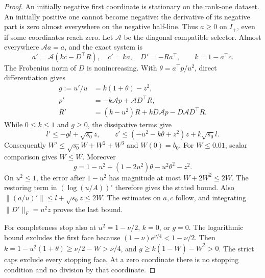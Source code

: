 \documentclass{article} %
\theoremstyle{plain}
\theoremstyle{definition}
\theoremstyle{remark}
\begin{document}
\begin{proof}
An initially negative first coordinate is stationary on the rank-one
dataset. An initially positive one cannot become negative: the derivative
of its negative part is zero almost everywhere on the negative half-line.
Thus $a\ge0$ on $I_+$, even if some coordinates reach zero. Let
$\mathcal A$ be the diagonal compatible selector. Almost everywhere
$\mathcal A a=a$, and the exact system is
\[
 a'=\mathcal A(kc-D^\top R),\quad c'=ka,\quad D'=-Ra^\top,
 \qquad k=1-a^\top c.
\]
The Frobenius norm of $D$ is nonincreasing. With
$\theta=a^\top p/u^2$, direct differentiation gives
\begin{align*}
 g:=u'/u&=k(1+\theta)-z^2,\\
 p'&=-k\mathcal A p+\mathcal A D^\top R,\\
 R'&=(k-u^2)R+kD\mathcal A p-D\mathcal A D^\top R.
\end{align*}
While $0\le k\le1$ and $g\ge0$, the dissipative terms give
\[
 l'\le-gl+\sqrt{s_0}z,\qquad
 z'\le(-u^2-k\theta+z^2)z+k\sqrt{s_0}l.
\]
Consequently $W'\le\sqrt{s_0}W+W^2+W^3$ and $W(0)=b_0$.
For $W\le0.01$, scalar comparison gives $W\le\overline W$.
Moreover
\[
 g=1-u^2+(1-2u^2)\theta-u^2\theta^2-z^2.
\]
On $u^2\le1$, the error after $1-u^2$ has magnitude at most
$W+2W^2\le2\overline W$.
The restoring term in $(\log(u/A))'$ therefore gives the stated bound.
Also
$\|(a/u)'\|\le l+\sqrt{s_0}z\le2\overline W$.
The estimates on $a,c$ follow, and integrating
$\|D'\|_F=u^2z$ proves the last bound.

For completeness stop also at $u^2=1-\nu/2$, $k=0$, or $g=0$.
The logarithmic bound excludes the first face because
$(1-\nu)e^{\nu/4}<1-\nu/2$.
Then $k=1-u^2(1+\theta)\ge\nu/2-\overline W>\nu/4$,
and $g\ge k(1-\overline W)-\overline W^2>0$.
The strict caps exclude every stopping face. At a zero coordinate there
is no stopping condition and no division by that coordinate.
\end{proof}
\end{document}

